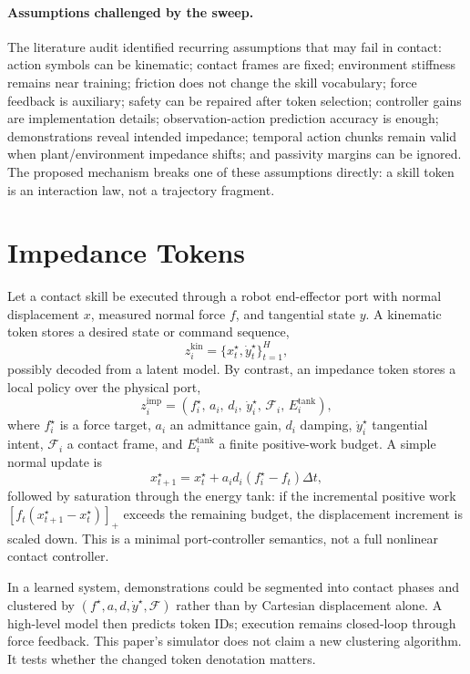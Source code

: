 \documentclass{article}
\newcommand{\ftarget}{f^\star}
\newcommand{\etank}{E^{\mathrm{tank}}}
\begin{document}
\paragraph{Assumptions challenged by the sweep.}
The literature audit identified recurring assumptions that may fail in contact: action symbols can be kinematic; contact frames are fixed; environment stiffness remains near training; friction does not change the skill vocabulary; force feedback is auxiliary; safety can be repaired after token selection; controller gains are implementation details; observation-action prediction accuracy is enough; demonstrations reveal intended impedance; temporal action chunks remain valid when plant/environment impedance shifts; and passivity margins can be ignored. The proposed mechanism breaks one of these assumptions directly: a skill token is an interaction law, not a trajectory fragment.

\section{Impedance Tokens}

Let a contact skill be executed through a robot end-effector port with normal displacement $x$, measured normal force $f$, and tangential state $y$. A kinematic token stores a desired state or command sequence,
\[
    z_i^{\mathrm{kin}} = \{x_t^\star, \dot{y}_t^\star\}_{t=1}^H ,
\]
possibly decoded from a latent model. By contrast, an impedance token stores a local policy over the physical port,
\[
    z_i^{\mathrm{imp}} =
    \left(\ftarget_i,\, a_i,\, d_i,\, \dot{y}_i^\star,\, \mathcal{F}_i,\, \etank_i\right),
\]
where $\ftarget_i$ is a force target, $a_i$ an admittance gain, $d_i$ damping, $\dot{y}_i^\star$ tangential intent, $\mathcal{F}_i$ a contact frame, and $\etank_i$ a finite positive-work budget. A simple normal update is
\begin{equation}
    x_{t+1}^{\star} = x_t^{\star} + a_i d_i (\ftarget_i - f_t) \Delta t,
    \label{eq:token}
\end{equation}
followed by saturation through the energy tank: if the incremental positive work $[f_t(x_{t+1}^{\star}-x_t^{\star})]_+$ exceeds the remaining budget, the displacement increment is scaled down. This is a minimal port-controller semantics, not a full nonlinear contact controller.

In a learned system, demonstrations could be segmented into contact phases and clustered by $(\ftarget, a, d, \dot{y}^\star,\mathcal{F})$ rather than by Cartesian displacement alone. A high-level model then predicts token IDs; execution remains closed-loop through force feedback. This paper's simulator does not claim a new clustering algorithm. It tests whether the changed token denotation matters.
\end{document}
